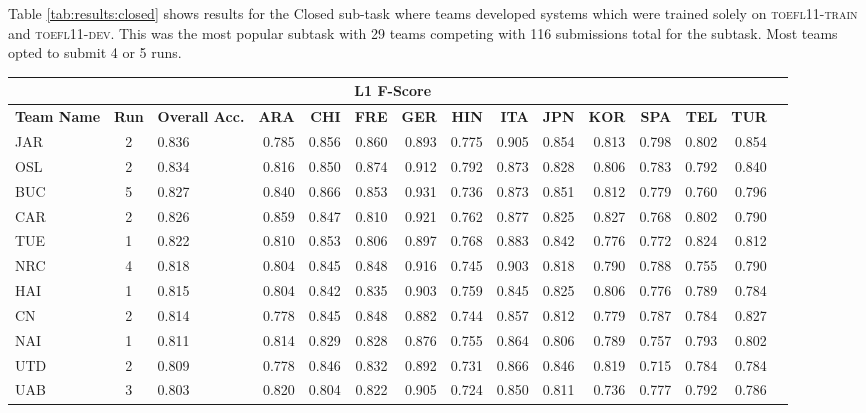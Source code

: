 \documentclass[11pt,letterpaper]{article}
\begin{document}
Table \ref{tab:results:closed} shows results for the Closed sub-task where teams
developed systems which were trained solely on \textsc{toefl11-train} and \textsc{toefl11-dev}.  This
was the most popular subtask with 29 teams competing with 116 submissions total
for the subtask.  Most teams opted to submit 4 or 5 runs.

\begin{table*}
\begin{footnotesize}
\begin{tabular}{|p{1cm}|c|p{1cm}|r|r|r|r|r|r|r|r|r|r|r|r|}
\hline
\rowcolor{gray!50}
\multicolumn{3}{|c|}{} & \multicolumn{11}{c|}{\bf L1 F-Score}\\\hline
{\bf Team Name} & {\bf Run} & {\bf Overall Acc.} & {\bf ARA} & {\bf CHI} & {\bf FRE} & {\bf GER} & {\bf HIN} & {\bf ITA} & {\bf JPN} & {\bf KOR} & {\bf SPA} & {\bf TEL} & {\bf TUR}\\\hline
  JAR & 2  & 0.836 & 0.785 & 0.856 & 0.860 & 0.893 & 0.775 & 0.905 & 0.854 & 0.813 & 0.798 & 0.802 & 0.854\\\hline
OSL   & 2  & 0.834 & 0.816 & 0.850 & 0.874 & 0.912 & 0.792 & 0.873 & 0.828 & 0.806 & 0.783 & 0.792 & 0.840\\\hline
 BUC  & 5  & 0.827 & 0.840 & 0.866 & 0.853 & 0.931 & 0.736 & 0.873 & 0.851 & 0.812 & 0.779 & 0.760 & 0.796\\\hline
CAR   & 2  & 0.826 & 0.859 & 0.847 & 0.810 & 0.921 & 0.762 & 0.877 & 0.825 & 0.827 & 0.768 & 0.802 & 0.790\\\hline
  TUE & 1  & 0.822 & 0.810 & 0.853 & 0.806 & 0.897 & 0.768 & 0.883 & 0.842 & 0.776 & 0.772 & 0.824 & 0.812\\\hline
 NRC  & 4  & 0.818 & 0.804 & 0.845 & 0.848 & 0.916 & 0.745 & 0.903 & 0.818 & 0.790 & 0.788 & 0.755 & 0.790\\\hline
HAI   & 1  & 0.815 & 0.804 & 0.842 & 0.835 & 0.903 & 0.759 & 0.845 & 0.825 & 0.806 & 0.776 & 0.789 & 0.784\\\hline
 CN  & 2  & 0.814 & 0.778 & 0.845 & 0.848 & 0.882 & 0.744 & 0.857 & 0.812 & 0.779 & 0.787 & 0.784 & 0.827\\\hline
 NAI  & 1  & 0.811 & 0.814 & 0.829 & 0.828 & 0.876 & 0.755 & 0.864 & 0.806 & 0.789 & 0.757 & 0.793 & 0.802\\\hline
 UTD  & 2  & 0.809 & 0.778 & 0.846 & 0.832 & 0.892 & 0.731 & 0.866 & 0.846 & 0.819 & 0.715 & 0.784 & 0.784\\\hline
 UAB  & 3  & 0.803 & 0.820 & 0.804 & 0.822 & 0.905 & 0.724 & 0.850 & 0.811 & 0.736 & 0.777 & 0.792 & 0.786\\\hline

\end{tabular}
\end{footnotesize}
\end{table*}
\end{document}
